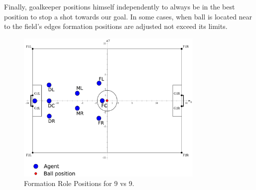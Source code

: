 Finally, goalkeeper positions himself independently to always be in the best position to stop a shot towards our goal. In some cases, when ball is located near to the field's edges formation positions are adjusted not exceed its limits.
\begin{figure}[htb!]
\centering
  \includegraphics[width=0.8\textwidth]{Chapter4/figures/Formation9_0.pdf}
  \caption{Formation Role Positions for 9 vs 9.} 
  \label{fig:Formation9_0}
\end{figure}

